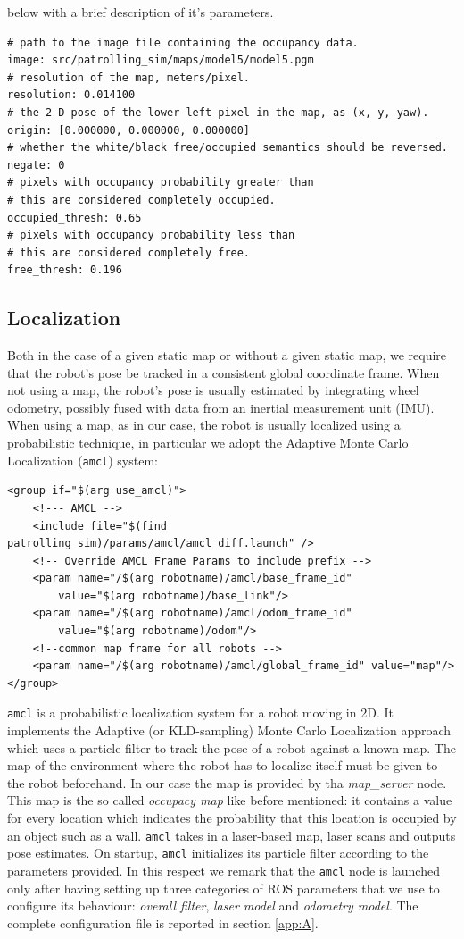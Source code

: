 below with a brief description of it's parameters.
\begin{lstlisting}
# path to the image file containing the occupancy data.
image: src/patrolling_sim/maps/model5/model5.pgm
# resolution of the map, meters/pixel.
resolution: 0.014100
# the 2-D pose of the lower-left pixel in the map, as (x, y, yaw).
origin: [0.000000, 0.000000, 0.000000]
# whether the white/black free/occupied semantics should be reversed.
negate: 0
# pixels with occupancy probability greater than 
# this are considered completely occupied.
occupied_thresh: 0.65
# pixels with occupancy probability less than 
# this are considered completely free.
free_thresh: 0.196
\end{lstlisting}

\subsection{Localization}
Both in the case of a given static map or without a given static map, we
require that the robot’s pose be tracked in a consistent global coordinate frame.
When not using a map, the robot’s pose is usually estimated by integrating
wheel odometry, possibly fused with data from an inertial measurement unit
(IMU). When using a map, as in our case, the robot is usually localized using
a probabilistic technique, in particular we adopt the Adaptive Monte Carlo
Localization (\texttt{amcl}) system:
\begin{lstlisting}
<group if="$(arg use_amcl)">
    <!--- AMCL -->
    <include file="$(find patrolling_sim)/params/amcl/amcl_diff.launch" />       
    <!-- Override AMCL Frame Params to include prefix -->
    <param name="/$(arg robotname)/amcl/base_frame_id" 
        value="$(arg robotname)/base_link"/>
    <param name="/$(arg robotname)/amcl/odom_frame_id" 
        value="$(arg robotname)/odom"/>
    <!--common map frame for all robots -->
    <param name="/$(arg robotname)/amcl/global_frame_id" value="map"/> 
</group>
\end{lstlisting}
\texttt{amcl} is a probabilistic localization system for a robot moving in 2D.
It implements the Adaptive (or KLD-sampling) Monte Carlo Localization
approach which uses a particle filter to track the pose of a robot against
a known map. The map of the environment where the robot has to localize
itself must be given to the robot beforehand. In our case the map is provided
by tha \textit{map\_server} node. This map is the so called \textit{occupacy map}
like before mentioned: it contains a value for every location which indicates the 
probability that this location is occupied by an object such as a wall. 
\texttt{amcl} takes in a laser-based map, laser scans and outputs pose estimates.
On startup, \texttt{amcl} initializes its particle filter according to the parameters
provided. In this respect we remark that the \texttt{amcl} node is launched only 
after having setting up three categories of ROS parameters that we use to configure 
its behaviour: \textit{overall filter}, \textit{laser model} and \textit{odometry model}.
The complete configuration file is reported in section \ref{app:A}.

